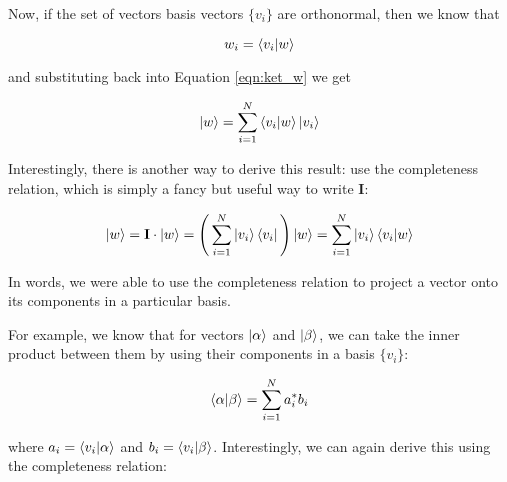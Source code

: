 \documentclass[11pt, oneside]{article}   	%
\begin{document}
\bigskip
\noindent
Now, if the set of vectors basis vectors  $\{v_i\}$ are orthonormal, then we know that 

\begin{equation*}
w_i  =  \braket{v_i  | w}
\end{equation*}

\bigskip
\noindent
and substituting back into Equation \ref{eqn:ket_w} we get

\begin{equation*}
\ket{w} =  \sum\limits_{i = 1}^{N}  \braket{v_i  | w} \ket{v_i}
\end{equation*}

\bigskip
\noindent
Interestingly, there is another way to derive this result:  use the completeness relation, which is simply a fancy but useful way to write \textbf{I}:

\begin{equation*}
\ket{w} =  \mathbf{I} \cdot \ket{w} =  \Bigg (\sum\limits_{i = 1}^{N}  \ket{v_i} \bra{v_i} \Bigg ) \ket{w} = \sum\limits_{i = 1}^{N}  \ket{v_i} \braket{v_i | w}
\end{equation*} 

\bigskip
\noindent
In words, we were able to use the completeness relation to project a vector onto its components in a particular basis.

\bigskip
\noindent
For example, we know that for vectors $\ket{\alpha}$ and $\ket{\beta}$, we can take the inner product between them by using their components in a basis $\{v_i\}$:

\bigskip
\begin{equation*}
\braket{\alpha  | \beta} = \sum\limits_{i = 1}^{N} a_i^* b_i
\end{equation*} 

\bigskip
\noindent
where $a_i = \braket{v_i | \alpha}$ and $b_i = \braket{v_i | \beta}$. Interestingly, we can again derive this using the completeness relation:

%
%
%
\end{document}
